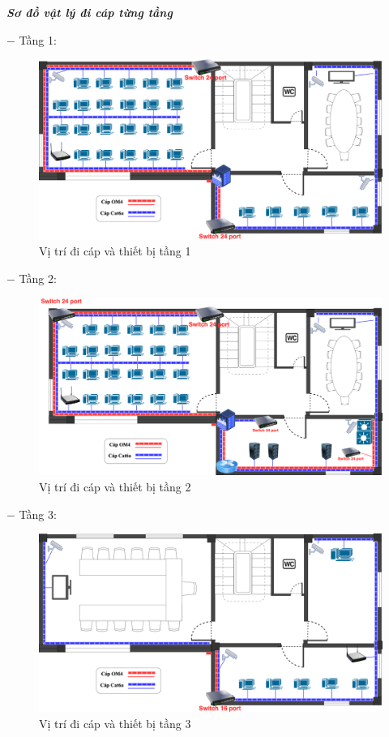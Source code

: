 \textbf{\textit{Sơ đồ vật lý đi cáp từng tầng}}

$-$ Tầng 1:

\begin{figure}[htbp]
    \centering
    \includegraphics[width=1\linewidth]{img/floor1-2.png}
    \caption{Vị trí đi cáp và thiết bị tầng 1}
\end{figure}

$-$ Tầng 2:

\begin{figure}[htbp]
    \centering
    \includegraphics[width=1\linewidth]{img/floor2-2.png}
    \caption{Vị trí đi cáp và thiết bị tầng 2}
\end{figure}
\newpage
$-$ Tầng 3:

\begin{figure}[htbp]
    \centering
    \includegraphics[width=1\linewidth]{img/floor3-2.png}
    \caption{Vị trí đi cáp và thiết bị tầng 3}
\end{figure}

